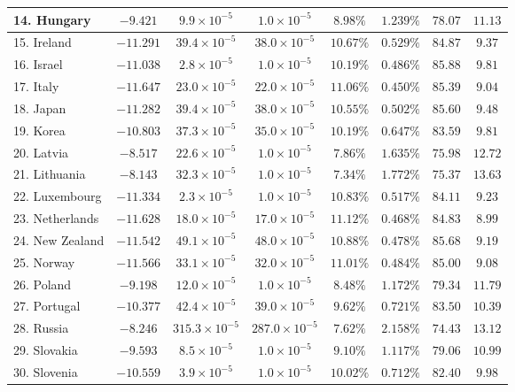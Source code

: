 \documentclass[12pt, titlepage]{article}%
\begin{document}
\begin{table}
\begin{center}
\begin{tabular}{||l|c|c|c|c|c|c|c||}
14. Hungary &  $-9.421$ & $9.9\times10^{-5}$ & $1.0\times10^{-5}$ & $8.98\%$ & $1.239\%$ & $78.07$ & $11.13$\\ \hline
15. Ireland &  $-11.291$ & $39.4\times10^{-5}$ & $38.0\times10^{-5}$ & $10.67\%$ & $0.529\%$ & $84.87$ & $9.37$\\ \hline
16. Israel &  $-11.038$ & $2.8\times10^{-5}$ & $1.0\times10^{-5}$ & $10.19\%$ & $0.486\%$ & $85.88$ & $9.81$\\ \hline
17. Italy &  $-11.647$ & $23.0\times10^{-5}$ & $22.0\times10^{-5}$ & $11.06\%$ & $0.450\%$ & $85.39$ & $9.04$\\ \hline
18. Japan &  $-11.282$ & $39.4\times10^{-5}$ & $38.0\times10^{-5}$ & $10.55\%$ & $0.502\%$ & $85.60$ & $9.48$\\ \hline
19. Korea &  $-10.803$ & $37.3\times10^{-5}$ & $35.0\times10^{-5}$ & $10.19\%$ & $0.647\%$ & $83.59$ & $9.81$\\ \hline
20. Latvia &  $-8.517$ & $22.6\times10^{-5}$ & $1.0\times10^{-5}$ & $7.86\%$ & $1.635\%$ & $75.98$ & $12.72$\\ \hline
21. Lithuania &  $-8.143$ & $32.3\times10^{-5}$ & $1.0\times10^{-5}$ & $7.34\%$ & $1.772\%$ & $75.37$ & $13.63$\\ \hline
22. Luxembourg &  $-11.334$ & $2.3\times10^{-5}$ & $1.0\times10^{-5}$ & $10.83\%$ & $0.517\%$ & $84.11$ & $9.23$\\ \hline
23. Netherlands &  $-11.628$ & $18.0\times10^{-5}$ & $17.0\times10^{-5}$ & $11.12\%$ & $0.468\%$ & $84.83$ & $8.99$\\ \hline
24. New Zealand &  $-11.542$ & $49.1\times10^{-5}$ & $48.0\times10^{-5}$ & $10.88\%$ & $0.478\%$ & $85.68$ & $9.19$\\ \hline
25. Norway &  $-11.566$ & $33.1\times10^{-5}$ & $32.0\times10^{-5}$ & $11.01\%$ & $0.484\%$ & $85.00$ & $9.08$\\ \hline
26. Poland &  $-9.198$ & $12.0\times10^{-5}$ & $1.0\times10^{-5}$ & $8.48\%$ & $1.172\%$ & $79.34$ & $11.79$\\ \hline
27. Portugal &  $-10.377$ & $42.4\times10^{-5}$ & $39.0\times10^{-5}$ & $9.62\%$ & $0.721\%$ & $83.50$ & $10.39$\\ \hline
28. Russia &  $-8.246$ & $315.3\times10^{-5}$ & $287.0\times10^{-5}$ & $7.62\%$ & $2.158\%$ & $74.43$ & $13.12$\\ \hline
29. Slovakia &  $-9.593$ & $8.5\times10^{-5}$ & $1.0\times10^{-5}$ & $9.10\%$ & $1.117\%$ & $79.06$ & $10.99$\\ \hline
30. Slovenia &  $-10.559$ & $3.9\times10^{-5}$ & $1.0\times10^{-5}$ & $10.02\%$ & $0.712\%$ & $82.40$ & $9.98$\\ \hline

\end{tabular}
\end{center}
\end{table}
\end{document}
